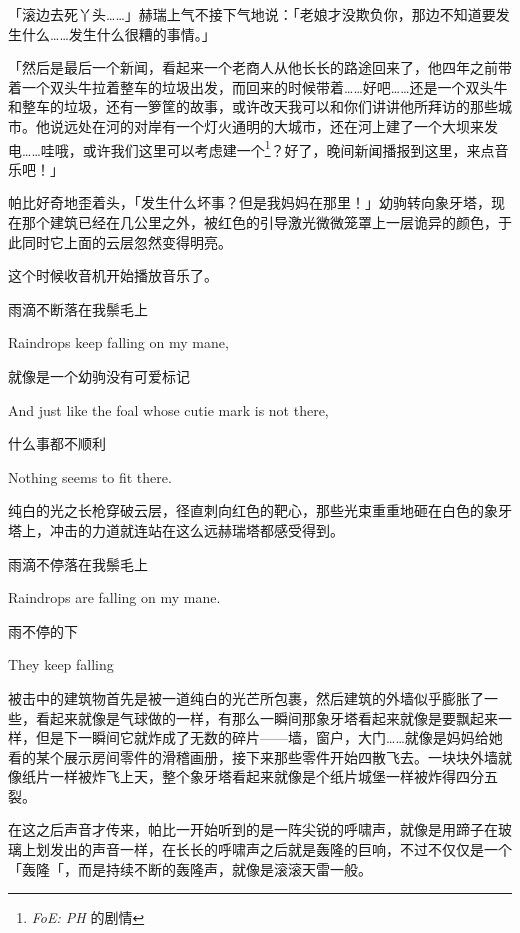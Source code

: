 「滚边去死丫头……」赫瑞上气不接下气地说：「老娘才没欺负你，那边不知道要发生什么……发生什么很糟的事情。」

「{\rt 然后是最后一个新闻，看起来一个老商人从他长长的路途回来了，他四年之前带着一个双头牛拉着整车的垃圾出发，而回来的时候带着……好吧……还是一个双头牛和整车的垃圾，还有一箩筐的故事，或许改天我可以和你们讲讲他所拜访的那些城市。他说远处在河的对岸有一个灯火通明的大城市，还在河上建了一个大坝来发电……哇哦，或许我们这里可以考虑建一个\footnote{\emph{FoE: PH} 的剧情}？好了，晚间新闻播报到这里，来点音乐吧！}」

帕比好奇地歪着头，「发生什么坏事？但是我妈妈在那里！」幼驹转向象牙塔，现在那个建筑已经在几公里之外，被红色的引导激光微微笼罩上一层诡异的颜色，于此同时它上面的云层忽然变得明亮。

这个时候收音机开始播放音乐了。

\begin{song}
雨滴不断落在我鬃毛上

Raindrops keep falling on my mane,

\medskip

就像是一个幼驹没有可爱标记

And just like the foal whose cutie mark is not there,

\medskip

什么事都不顺利

Nothing seems to fit there.
\end{song}

纯白的光之长枪穿破云层，径直刺向红色的靶心，那些光束重重地砸在白色的象牙塔上，冲击的力道就连站在这么远赫瑞塔都感受得到。

\begin{song}
雨滴不停落在我鬃毛上

Raindrops are falling on my mane.

\medskip

雨不停的下

They keep falling
\end{song}

被击中的建筑物首先是被一道纯白的光芒所包裹，然后建筑的外墙似乎膨胀了一些，看起来就像是气球做的一样，有那么一瞬间那象牙塔看起来就像是要飘起来一样，但是下一瞬间它就炸成了无数的碎片——墙，窗户，大门……就像是妈妈给她看的某个展示房间零件的滑稽画册，接下来那些零件开始四散飞去。一块块外墙就像纸片一样被炸飞上天，整个象牙塔看起来就像是个纸片城堡一样被炸得四分五裂。

在这之后声音才传来，帕比一开始听到的是一阵尖锐的呼啸声，就像是用蹄子在玻璃上划发出的声音一样，在长长的呼啸声之后就是轰隆的巨响，不过不仅仅是一个「轰隆「，而是持续不断的轰隆声，就像是滚滚天雷一般。

